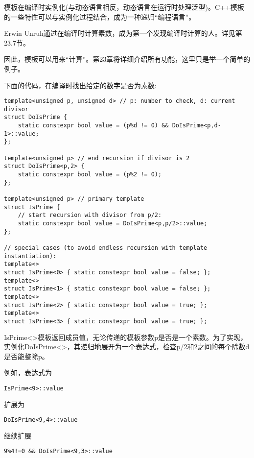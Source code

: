 模板在编译时实例化(与动态语言相反，动态语言在运行时处理泛型)。C++模板的一些特性可以与实例化过程结合，成为一种递归“编程语言”。

\begin{tcolorbox}[colback=webgreen!5!white,colframe=webgreen!75!black]
\hspace*{0.75cm}Erwin Unruh通过在编译时计算素数，成为第一个发现编译时计算的人。详见第23.7节。
\end{tcolorbox}

因此，模板可以用来“计算”。第23章将详细介绍所有功能，这里只是举一个简单的例子。

下面的代码，在编译时找出给定的数字是否为素数:

\begin{lstlisting}[style=styleCXX]
template<unsigned p, unsigned d> // p: number to check, d: current divisor
struct DoIsPrime {
	static constexpr bool value = (p%d != 0) && DoIsPrime<p,d-1>::value;
};

template<unsigned p> // end recursion if divisor is 2
struct DoIsPrime<p,2> {
	static constexpr bool value = (p%2 != 0);
};

template<unsigned p> // primary template
struct IsPrime {
	// start recursion with divisor from p/2:
	static constexpr bool value = DoIsPrime<p,p/2>::value;
};

// special cases (to avoid endless recursion with template instantiation):
template<>
struct IsPrime<0> { static constexpr bool value = false; };
template<>
struct IsPrime<1> { static constexpr bool value = false; };
template<>
struct IsPrime<2> { static constexpr bool value = true; };
template<>
struct IsPrime<3> { static constexpr bool value = true; };
\end{lstlisting}

IsPrime<>模板返回成员值，无论传递的模板参数p是否是一个素数。为了实现，实例化DoIsPrime<>，其递归地展开为一个表达式，检查p/2和2之间的每个除数d是否能整除p。

例如，表达式为

\begin{lstlisting}[style=styleCXX]
IsPrime<9>::value
\end{lstlisting}

扩展为

\begin{lstlisting}[style=styleCXX]
DoIsPrime<9,4>::value
\end{lstlisting}

继续扩展

\begin{lstlisting}[style=styleCXX]
9%4!=0 && DoIsPrime<9,3>::value
\end{lstlisting}

